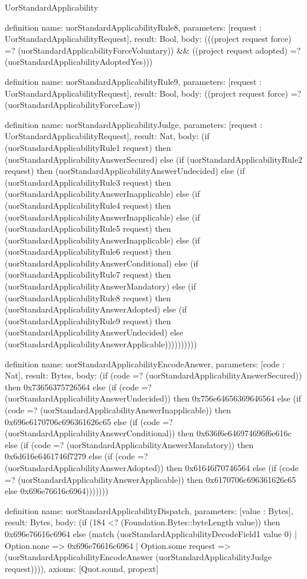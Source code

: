 \begin{lexlean}{UorStandardApplicability}
\begin{semanticmodule}
definition{
  name: uorStandardApplicabilityRule8,
  parameters: [request : UorStandardApplicabilityRequest],
  result: Bool,
  body: (((project request force) =? (uorStandardApplicabilityForceVoluntary)) && ((project request adopted) =? (uorStandardApplicabilityAdoptedYes)))
}

definition{
  name: uorStandardApplicabilityRule9,
  parameters: [request : UorStandardApplicabilityRequest],
  result: Bool,
  body: ((project request force) =? (uorStandardApplicabilityForceLaw))
}

definition{
  name: uorStandardApplicabilityJudge,
  parameters: [request : UorStandardApplicabilityRequest],
  result: Nat,
  body: (if (uorStandardApplicabilityRule1 request) then (uorStandardApplicabilityAnswerSecured) else (if (uorStandardApplicabilityRule2 request) then (uorStandardApplicabilityAnswerUndecided) else (if (uorStandardApplicabilityRule3 request) then (uorStandardApplicabilityAnswerInapplicable) else (if (uorStandardApplicabilityRule4 request) then (uorStandardApplicabilityAnswerInapplicable) else (if (uorStandardApplicabilityRule5 request) then (uorStandardApplicabilityAnswerInapplicable) else (if (uorStandardApplicabilityRule6 request) then (uorStandardApplicabilityAnswerConditional) else (if (uorStandardApplicabilityRule7 request) then (uorStandardApplicabilityAnswerMandatory) else (if (uorStandardApplicabilityRule8 request) then (uorStandardApplicabilityAnswerAdopted) else (if (uorStandardApplicabilityRule9 request) then (uorStandardApplicabilityAnswerUndecided) else (uorStandardApplicabilityAnswerApplicable))))))))))
}

definition{
  name: uorStandardApplicabilityEncodeAnswer,
  parameters: [code : Nat],
  result: Bytes,
  body: (if (code =? (uorStandardApplicabilityAnswerSecured)) then 0x73656375726564 else (if (code =? (uorStandardApplicabilityAnswerUndecided)) then 0x756e64656369646564 else (if (code =? (uorStandardApplicabilityAnswerInapplicable)) then 0x696e6170706c696361626c65 else (if (code =? (uorStandardApplicabilityAnswerConditional)) then 0x636f6e646974696f6e616c else (if (code =? (uorStandardApplicabilityAnswerMandatory)) then 0x6d616e6461746f7279 else (if (code =? (uorStandardApplicabilityAnswerAdopted)) then 0x61646f70746564 else (if (code =? (uorStandardApplicabilityAnswerApplicable)) then 0x6170706c696361626c65 else 0x696e76616c6964)))))))
}

definition{
  name: uorStandardApplicabilityDispatch,
  parameters: [value : Bytes],
  result: Bytes,
  body: (if (184 <? (Foundation.Bytes::byteLength value)) then 0x696e76616c6964 else (match (uorStandardApplicabilityDecodeField1 value 0)
    | Option.none => 0x696e76616c6964
    | Option.some request => (uorStandardApplicabilityEncodeAnswer (uorStandardApplicabilityJudge request)))),
  axioms: [Quot.sound, propext]
}
\end{semanticmodule}
\end{lexlean}
